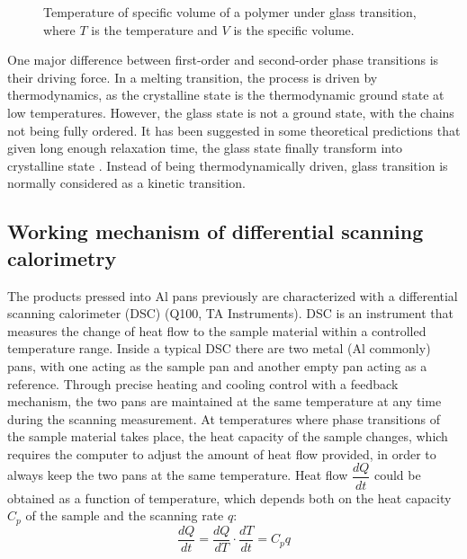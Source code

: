\begin{figure}[H]
	\center
	\vspace{1 cm}
	\caption{Temperature of specific volume of a polymer under glass transition, where $T$ is the temperature and $V$ is the specific volume.}
	\label{fig:V vs T for Tg}
\end{figure}

One major difference between first-order and second-order phase transitions is their driving force. In a melting transition, the process is driven by thermodynamics, as the crystalline state is the thermodynamic ground state at low temperatures. However, the glass state is not a ground state, with the chains not being fully ordered. It has been suggested in some theoretical predictions that given long enough relaxation time, the glass state finally transform into crystalline state \cite{Gotze2009}. Instead of being thermodynamically driven, glass transition is normally considered as a kinetic transition.

\subsection{Working mechanism of differential scanning calorimetry}

The products pressed into Al pans previously are characterized with a differential scanning calorimeter (DSC) (Q100, TA Instruments). DSC is an instrument that measures the change of heat flow to the sample material within a controlled temperature range. Inside a typical DSC there are two metal (Al commonly) pans, with one acting as the sample pan and another empty pan acting as a reference. Through precise heating and cooling control with a feedback mechanism, the two pans are maintained at the same temperature at any time during the scanning measurement. At temperatures where phase transitions of the sample material takes place, the heat capacity of the sample changes, which requires the computer to adjust the amount of heat flow provided, in order to always keep the two pans at the same temperature. Heat flow $\dfrac{dQ}{dt}$ could be obtained as a function of temperature, which depends both on the heat capacity $C_{p}$ of the sample and the scanning rate $q$:
\begin{equation}
\label{eqn_DSC}
\dfrac{dQ}{dt} = \dfrac{dQ}{dT}\cdot\dfrac{dT}{dt} = C_{p} q
\end{equation}

